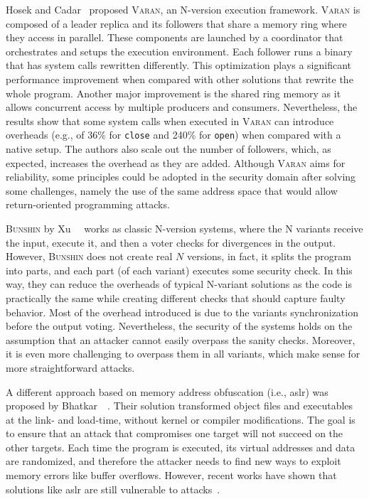 Hosek and Cadar~\cite{Hosek:2015} proposed \textsc{Varan}, an N-version execution framework.
\textsc{Varan} is composed of a leader replica and its followers that share a memory ring where they access in parallel.
These components are launched by a coordinator that orchestrates and setups the execution environment.
Each follower runs a binary that has system calls rewritten differently.
This optimization plays a significant performance improvement when compared with other solutions that rewrite the whole program.
Another major improvement is the shared ring memory as it allows concurrent access by multiple producers and consumers.
Nevertheless, the results show that some system calls when executed in \textsc{Varan} can introduce overheads (e.g., of 36\% for \texttt{close} and 240\% for \texttt{open}) when compared with a native setup.
The authors also scale out the number of followers, which, as expected, increases the overhead as they are added. 
Although \textsc{Varan} aims for reliability, some principles could be adopted in the security domain after solving some challenges, namely the use of the same address space that would allow return-oriented programming attacks.

\textsc{Bunshin} by Xu~\etal{}~\cite{Xu:2017c} works as classic N-version systems, where the N variants receive the input, execute it, and then a voter checks for divergences in the output.
However, \textsc{Bunshin} does not create real $N$ versions, in fact, it splits the program into parts, and each part (of each variant) executes some security check. 
In this way, they can reduce the overheads of typical N-variant solutions as the code is practically the same while creating different checks that should capture faulty behavior.
Most of the overhead introduced is due to the variants synchronization before the output voting.
Nevertheless, the security of the systems holds on the assumption that an attacker cannot easily overpass the sanity checks.
Moreover, it is even more challenging to overpass them in all variants, which make sense for more straightforward attacks.


A different approach based on memory address obfuscation (i.e., \gls{aslr}) was proposed by Bhatkar~\etal{}~\cite{Bhatkar:2003}.
Their solution transformed object files and executables at the link- and load-time, without kernel or compiler modifications. 
The goal is to ensure that an attack that compromises one target will not succeed on the other targets. 
Each time the program is executed, its virtual addresses and data are randomized, and therefore the attacker needs to find new ways to exploit memory errors like buffer overflows. 
However, recent works have shown that solutions like \gls{aslr} are still vulnerable to attacks~\cite{Bittau:2014,Jang:2016,Snow:2013,vanderVeen:2017}.

